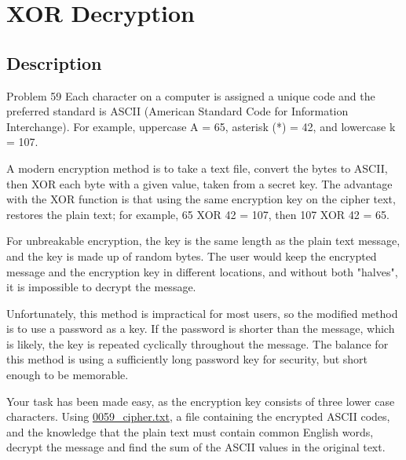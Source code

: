 \chapter{XOR Decryption}
\section{Description}
Problem 59
Each character on a computer is assigned a unique code and the preferred standard is ASCII (American Standard Code for
Information Interchange). For example, uppercase A = 65, asterisk (*) = 42, and lowercase k = 107.

A modern encryption method is to take a text file, convert the bytes to ASCII, then XOR each byte with a given value,
taken from a secret key. The advantage with the XOR function is that using the same encryption key on the cipher text,
restores the plain text; for example, 65 XOR 42 = 107, then 107 XOR 42 = 65.

For unbreakable encryption, the key is the same length as the plain text message, and the key is made up of random
bytes. The user would keep the encrypted message and the encryption key in different locations, and without both
"halves", it is impossible to decrypt the message.

Unfortunately, this method is impractical for most users, so the modified method is to use a password as a key. If the
password is shorter than the message, which is likely, the key is repeated cyclically throughout the message. The
balance for this method is using a sufficiently long password key for security, but short enough to be memorable.

Your task has been made easy, as the encryption key consists of three lower case characters. Using
\href{https://projecteuler.net/resources/documents/0059_cipher.txt}{0059\_cipher.txt}, a file containing the encrypted
ASCII codes, and the knowledge that the plain text must contain common English words, decrypt the message and find the
sum of the ASCII values in the original text.
